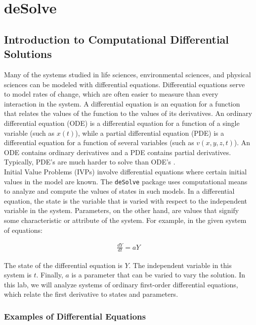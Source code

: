 \chapter{deSolve}
\section{Introduction to Computational Differential Solutions}

Many of the systems studied in life sciences, environmental sciences, and physical sciences can be modeled with differential equations. Differential equations serve to model rates of change, which are often easier to measure than every interaction in the system. A differential equation is an equation for a function that relates the values of the function to the values of its derivatives. An ordinary differential equation (ODE) is a differential equation for a function of a single variable (such as $x(t)$), while a partial differential equation (PDE) is a differential equation for a function of several variables (such as $v(x,y,z,t)$). An ODE contains ordinary derivatives and a PDE contains partial derivatives. Typically, PDE's are much harder to solve than ODE's \cite{chasnov}. \\

Initial Value Problems (IVPs) involve differential equations where certain initial values in the model are known. The \texttt{deSolve} package uses computational means to analyze and compute the values of states in such models. In a differential equation, the state is the variable that is varied with respect to the independent variable in the system. Parameters, on the other hand, are values that signify some characteristic or attribute of the system. For example, in the given system of equations:

\begin{gather*}
    \frac{dY}{dt}=aY
\end{gather*}

The state of the differential equation is $Y$. The independent variable in this system is $t$. Finally, $a$ is a parameter that can be varied to vary the solution. In this lab, we will analyze systems of ordinary first-order differential equations, which relate the first derivative to states and parameters.

\subsection{Examples of Differential Equations}

